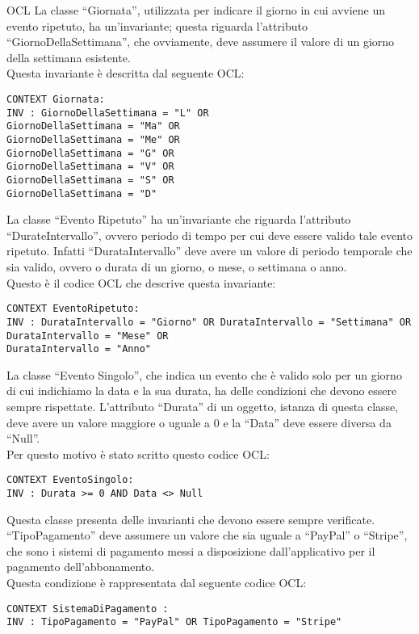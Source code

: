 \begin{listaPersonale}{OCL}
    La classe “Giornata”, utilizzata per indicare il giorno in cui avviene un evento ripetuto, ha un’invariante; questa riguarda l’attributo “GiornoDellaSettimana”, che ovviamente, deve assumere il valore di un giorno della settimana esistente.\\
    Questa invariante è descritta dal seguente OCL:

    \begin{lstlisting}
CONTEXT Giornata:
INV : GiornoDellaSettimana = "L" OR
GiornoDellaSettimana = "Ma" OR
GiornoDellaSettimana = "Me" OR
GiornoDellaSettimana = "G" OR
GiornoDellaSettimana = "V" OR
GiornoDellaSettimana = "S" OR
GiornoDellaSettimana = "D"
    \end{lstlisting}




    La classe “Evento Ripetuto” ha un’invariante che riguarda l’attributo “DurateIntervallo”, ovvero periodo di tempo per cui deve essere valido tale evento ripetuto. Infatti “DurataIntervallo” deve avere un valore di periodo temporale che sia valido, ovvero o durata di un giorno, o mese, o settimana o anno. \\
    Questo è il codice OCL che descrive questa invariante:
    \begin{lstlisting}
CONTEXT EventoRipetuto:
INV : DurataIntervallo = "Giorno" OR DurataIntervallo = "Settimana" OR DurataIntervallo = "Mese" OR 
DurataIntervallo = "Anno"
    \end{lstlisting}




    La classe “Evento Singolo”, che indica un evento che è valido solo per un giorno di cui indichiamo la data e la sua durata, ha delle condizioni che devono essere sempre rispettate. L’attributo “Durata” di un oggetto, istanza di questa classe, deve avere un valore maggiore o uguale a 0 e la “Data” deve essere diversa da “Null”. \\
    Per questo motivo è stato scritto questo codice OCL:

    \begin{lstlisting}
CONTEXT EventoSingolo:
INV : Durata >= 0 AND Data <> Null
    \end{lstlisting}




    Questa classe presenta delle invarianti che devono essere sempre verificate. “TipoPagamento” deve assumere un valore che sia uguale a “PayPal” o “Stripe”, che sono i sistemi di pagamento messi a disposizione dall’applicativo per il pagamento dell’abbonamento. \\
    Questa condizione è rappresentata dal seguente codice OCL:
    \begin{lstlisting}
CONTEXT SistemaDiPagamento :
INV : TipoPagamento = "PayPal" OR TipoPagamento = "Stripe"


\end{lstlisting}
\end{listaPersonale}
